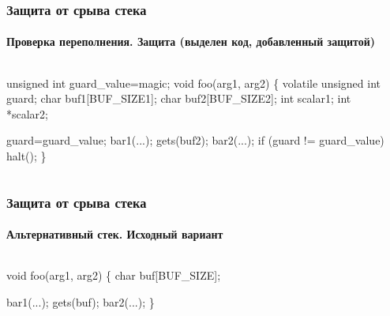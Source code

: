 \begin{frame}[fragile]
    \frametitle{Защита от срыва стека}
    \framesubtitle{Проверка переполнения. Защита (\alert{выделен} код, добавленный защитой)}

\begin{columns}
\begin{semiverbatim}
\alert{unsigned int guard_value=magic};
void foo(arg1, arg2) \{
\alert{    volatile unsigned int guard};
    char buf1[BUF_SIZE1];
    char buf2[BUF_SIZE2];
    int   scalar1;
    int  *scalar2;

\alert{    \only<2>{->}guard=guard_value};
    bar1(...);
    gets(buf2);
    bar2(...);
\alert{    if (guard != guard_value) halt()};
\}
\end{semiverbatim}
        \begin{block}{}
\begin{semiverbatim}
[scalar2     ]
[scalar1     ]
\end{semiverbatim}
        \end{block}
\end{columns}
\end{frame}


\begin{frame}[fragile]
    \frametitle{Защита от срыва стека}
    \framesubtitle{Альтернативный стек. Исходный вариант}

\begin{columns}
\begin{semiverbatim}
void foo(arg1, arg2) \{
    char buf[BUF_SIZE];
    
    bar1(...);
    \alert{gets(buf)};
    bar2(...);
\}
\end{semiverbatim}
        \begin{block}{}
\begin{semiverbatim}
\end{semiverbatim}
        \end{block}
\end{columns}
\end{frame}


